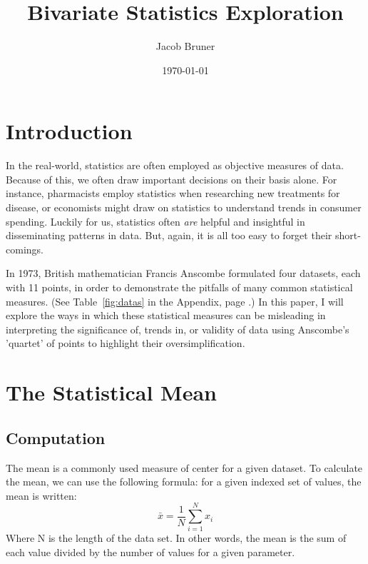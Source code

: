 \documentclass[11pt,a4paper]{article}
\author{Jacob Bruner}
\title{Bivariate Statistics Exploration}
\date{\today}
\begin{document}
\maketitle

\section{Introduction}

In the real-world, statistics are often employed as objective measures of data. Because of this, we often draw important decisions on their basis alone. For instance, pharmacists employ statistics when researching new treatments for disease, or economists might draw on statistics to understand trends in consumer spending. Luckily for us, statistics often \textit{are} helpful and insightful in disseminating patterns in data. But, again, it is all too easy to forget their short-comings.

In 1973, British mathematician Francis Anscombe formulated four datasets, each with 11 points, in order to demonstrate the pitfalls of many common statistical measures. (See Table~\ref{fig:datas} in the Appendix, page \pageref{Appendix}.) In this paper, I will explore the ways in which these statistical measures can be misleading in interpreting the significance of, trends in, or validity of data using Anscombe's 'quartet' of points to highlight their oversimplification.

\section{The Statistical Mean}
\subsection{Computation}
The mean is a commonly used measure of center for a given dataset. To calculate the mean, we can use the following formula: for a given indexed set of values, the mean is written:
\[
\bar{x} = \frac{1}{N} \sum_{i = 1}^{N} x_i
\]
Where N is the length of the data set. In other words, the mean is the sum of each value divided by the number of values for a given parameter. \\
\end{document}
